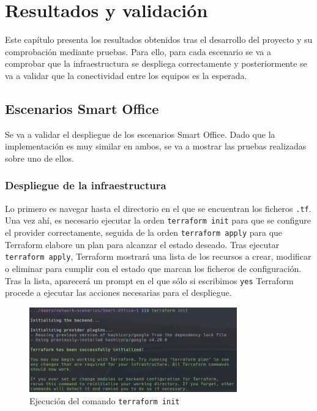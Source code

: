 \chapter{Resultados y validación} \label{ch:res}
  Este capítulo presenta los resultados obtenidos tras el desarrollo del proyecto y su comprobación mediante pruebas. Para ello, para cada escenario se va a comprobar que la infraestructura se despliega correctamente y posteriormente se va a validar que la conectividad entre los equipos es la esperada.

\section{Escenarios Smart Office}
  Se va a validar el despliegue de los escenarios Smart Office. Dado que la implementación es muy similar en ambos, se va a mostrar las pruebas realizadas sobre uno de ellos.

\subsection{Despliegue de la infraestructura}
 Lo primero es navegar hasta el directorio en el que se encuentran los ficheros \texttt{.tf}. Una vez ahí, es necesario ejecutar la orden \texttt{terraform init} para que se configure el provider correctamente, seguida de la orden \texttt{terraform apply} para que Terraform elabore un plan para alcanzar el estado deseado. Tras ejecutar \texttt{terraform apply}, Terraform mostrará una lista de los recursos a crear, modificar o eliminar para cumplir con el estado que marcan los ficheros de configuración. Tras la lista, aparecerá un prompt en el que sólo si escribimos \texttt{yes} Terraform procede a ejecutar las acciones necesarias para el despliegue.

  \begin{figure}[h]
  \centering
  \includegraphics[width=0.8\textwidth]{../imgs/desarrollo/resultados/so/init.png}
  \caption{Ejecución del comando \texttt{terraform init}}
  \end{figure}
  
